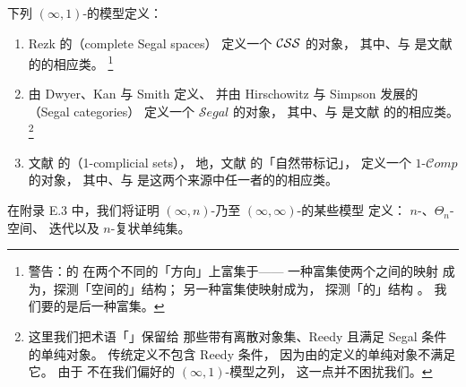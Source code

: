 \begin{example}\label{exa:cosmoi-models}
下列 $(\infty,1)$-\trCategory{}的模型定义\trCartesianClosed\trInfinityCosmos{}：
\begin{enumerate}[label=(\roman*)]
  \item Rezk 的\textbf{\trCompleteSegalSpaces}（complete Segal spaces）
  定义一个\trInfinityCosmos{} $\mathcal{CSS}$ 的对象，
  其中\trIsofibration{}、\trEquivalence{}与\trTrivialFibration
  是文献 \cite{bib100} 的\trModelStructure{}的相应类。%
  \footnote{警告：\trCompleteSegalSpaces{}的\trModelCategory
  在两个不同的「方向」上富集于\trSimplicialSet——
  一种富集使两个\trCompleteSegalSpaces{}之间的映射\trSimplicialSet
  成为\trKanComplex{}，探测「空间的」结构；
  另一种富集使映射\trSimplicialSet{}成为\trQuasiCategory{}，
  探测「\trCategory{}的」结构 \cite{bib64}。
  我们要的是后一种富集。}
\item 由 Dwyer、Kan 与 Smith \cite{bib38} 定义、
  并由 Hirschowitz 与 Simpson \cite{bib56} 发展的
  \textbf{\trSegalCategories}（Segal categories）
  定义一个\trInfinityCosmos{} $\mathcal{S}egal$ 的对象，
  其中\trIsofibration{}、\trEquivalence{}与\trTrivialFibration
  是文献 \cite{bib13,bib90} 的\trModelStructure{}的相应类。%
  \footnote{这里我们把术语「\trSegalCategories{}」保留给
  那些带有离散对象集、Reedy \trFibration{}且满足 Segal 条件的单纯对象。
  传统定义不包含 Reedy \trFibration{}条件，
  因为由\trKanComplex\trEnrichedCategory{}的\trNerve{}定义的单纯对象不满足它。
  由于\trKanComplex\trEnrichedCategory
  不在我们偏好的 $(\infty,1)$-\trCategory{}模型之列，
  这一点并不困扰我们。}
\item 文献 \cite{bib129} 的\textbf{\trOneComplicialSets}（1-complicial sets），
  \trEquivalence{}地，文献 \cite{bib78} 的「自然带标记\trQuasiCategory」，
  定义一个\trInfinityCosmos{} $1\text{-}\mathcal{C}omp$ 的对象，
  其中\trIsofibration{}、\trEquivalence{}与\trTrivialFibration
  是这两个来源中任一者的\trModelStructure{}的相应类。
\end{enumerate}
\end{example}

在附录 E.3 中，我们将证明
$(\infty,n)$-\trCategory{}乃至 $(\infty,\infty)$-\trCategory{}的某些模型
定义\trInfinityCosmos{}：
$n$-\trQuasiCategory{}、$\Theta_n$-空间、
迭代\trCompleteSegalSpaces{}以及 $n$-复状单纯集。

